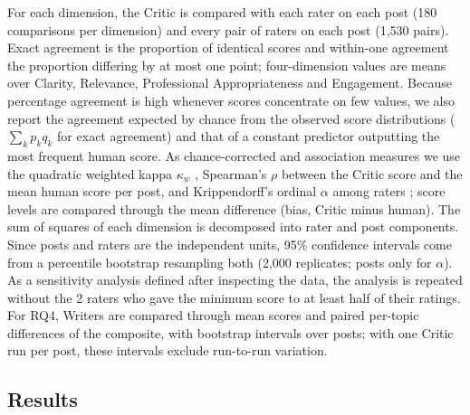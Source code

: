 \documentclass[a4paper,twoside]{article}
\newcommand{\NCHperDim}{180}
\newcommand{\NHHperDim}{1,530}
\newcommand{\FlaggedN}{2}
\begin{document}
For each dimension, the Critic is compared with each rater on each post (\NCHperDim{} comparisons per dimension) and every pair of raters on each post (\NHHperDim{} pairs). Exact agreement is the proportion of identical scores and within-one agreement the proportion differing by at most one point; four-dimension values are means over Clarity, Relevance, Professional Appropriateness and Engagement. Because percentage agreement is high whenever scores concentrate on few values, we also report the agreement expected by chance from the observed score distributions ($\sum_k p_k q_k$ for exact agreement) and that of a constant predictor outputting the most frequent human score. As chance-corrected and association measures we use the quadratic weighted kappa $\kappa_w$ \cite{cohen1968weighted}, Spearman's $\rho$ between the Critic score and the mean human score per post, and Krippendorff's ordinal $\alpha$ among raters \cite{krippendorff2018content}; score levels are compared through the mean difference (bias, Critic minus human). The sum of squares of each dimension is decomposed into rater and post components. Since posts and raters are the independent units, 95\% confidence intervals come from a percentile bootstrap resampling both \cite{efron1994bootstrap} (2,000 replicates; posts only for $\alpha$). As a sensitivity analysis defined after inspecting the data, the analysis is repeated without the \FlaggedN{} raters who gave the minimum score to at least half of their ratings. For RQ4, Writers are compared through mean scores and paired per-topic differences of the composite, with bootstrap intervals over posts; with one Critic run per post, these intervals exclude run-to-run variation.

\subsection{Results}
\end{document}
